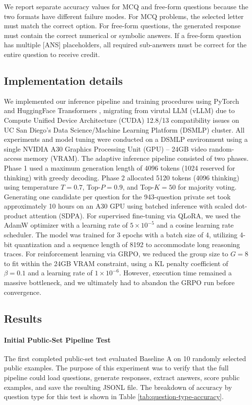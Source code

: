 \documentclass{article}
\begin{document}
We report separate accuracy values for MCQ and free-form questions because the two formats have different failure modes. For MCQ problems, the selected letter must match the correct option. For free-form questions, the generated response must contain the correct numerical or symbolic answers. If a free-form question has multiple [ANS] placeholders, all required sub-answers must be correct for the entire question to receive credit.
% 
\subsection{Implementation details}
\label{sec:implementation_details}
We implemented our inference pipeline and training procedures using PyTorch \cite{paszke2019pytorch} and HuggingFace Transformers \cite{wolf2020transformers}, migrating from virutal LLM (vLLM) \cite{kwon2023vllm} due to Compute Unified Device Architecture (CUDA) 12.8/13 compatibility issues on UC San Diego's Data Science/Machine Learning Platform (DSMLP) cluster. All experiments and model tuning were conducted on a DSMLP environment using a single NVIDIA A30 Graphics Processing Unit (GPU) -- 24GB video random-access memory (VRAM). The adaptive inference pipeline consisted of two phases. Phase 1 used a maximum generation length of 4096 tokens (1024 reserved for thinking) with greedy decoding. Phase 2 allocated 5120 tokens (4096 thinking) using temperature $T=0.7$, Top-$P=0.9$, and Top-$K=50$ for majority voting. Generating one candidate per question for the 943-question private set took approximately 10 hours on an A30 GPU using batched inference with scaled dot-product attention (SDPA). For supervised fine-tuning via QLoRA, we used the AdamW optimizer \cite{loshchilov2017decoupled} with a learning rate of $5 \times 10^{-5}$ and a cosine learning rate scheduler. The model was trained for 3 epochs with a batch size of 4, utilizing 4-bit quantization and a sequence length of 8192 to accommodate long reasoning traces. For reinforcement learning via GRPO, we reduced the group size to $G=8$ to fit within the 24GB VRAM constraint, using a KL penalty coefficient of $\beta=0.1$ and a learning rate of $1 \times 10^{-6}$. However, execution time remained a massive bottleneck, and we ultimately had to abandon the GRPO run before convergence.
% 
\subsection{Results}
\label{sec:results}

\paragraph{Initial Public-Set Pipeline Test} The first completed public-set test evaluated Baseline A on 10 randomly selected public examples. The purpose of this experiment was to verify that the full pipeline could load questions, generate responses, extract answers, score public examples, and save the resulting JSONL file. The breakdown of accuracy by question type for this test is shown in Table \ref{tab:question-type-accuracy}.
\end{document}
